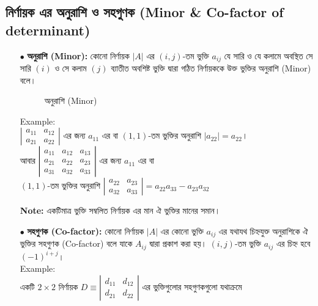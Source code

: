 \subsection{নির্ণায়ক এর অনুরাশি ও সহগুণক (Minor \& Co-factor of determinant)}
\begin{itemize}
	\item[$\bullet$] \textbf{অনুরাশি (Minor):} কোনো নির্ণায়ক $|A|$ এর $(i,j)$-তম ভুক্তি $a_{ij}$ যে সারি ও যে কলামে অবস্থিত সে সারি $(i)$ ও সে কলাম $(j)$ ব্যাতীত অবশিষ্ট ভুক্তি দ্বারা গঠিত নির্ণায়ককে উক্ত ভুক্তির অনুরাশি (Minor) বলে।\\ 
		\begin{figure}[h]
		\centering
		
		\caption{অনুরাশি (Minor)}
		\label{mat-fig-5}
	\end{figure}
	\newpage
	Example: \\ $\left|\begin{array}{cc}
	a_{11} & a_{12} \\
	a_{21} & a_{22}
	\end{array}\right|$ এর জন্য $a_{11}$ এর বা $(1,1)$-তম ভুক্তির অনুরাশি $|a_{22}|=a_{22}$।\\ 
	আবার
	$\left|\begin{array}{ccc}
	a_{11} & a_{12} & a_{13} \\
	a_{21} & a_{22} & a_{23} \\
	a_{31} & a_{32} & a_{33}
	\end{array}\right|$ এর জন্য $a_{11}$ এর বা \\$(1,1)$-তম ভুক্তির অনুরাশি $\left|\begin{array}{cc}
	a_{22} & a_{23} \\
	a_{32} & a_{33}
	\end{array}\right|=a_{22}a_{33}-a_{23}a_{32}$ 
	\begin{tcolorbox}
		\textbf{Note:} একটিমাত্র ভুক্তি সম্বলিত নির্ণায়ক এর মান ঐ ভুক্তির মানের সমান।
	\end{tcolorbox}
 	\item[$\bullet$] \textbf{সহগুণক (Co-factor):} কোনো নির্ণায়ক $|A|$ এর কোনো ভুক্তি $a_{ij}$ এর যথাযথ চিহ্নযুক্ত অনুরাশিকে ঐ ভুক্তির সহগুণক (Co-factor) বলে যাকে $A_{ij}$ দ্বারা প্রকাশ করা হয়। $(i,j)$-তম ভুক্তি $a_{ij}$ এর চিহ্ন হবে $(-1)^{i+j}$।\\
 	Example:\\ একটি $2\times 2$ নির্ণায়ক
 	$D\equiv\left|\begin{array}{cc}
 	d_{11} & d_{12} \\
 	d_{21} & d_{22}
 	\end{array}\right|$ এর ভুক্তিগুলোর সহগুণকগুলো যথাক্রমে \\

\end{itemize}
